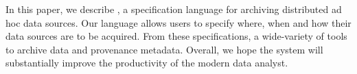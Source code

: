 

In this paper, we describe \padsd{}, a specification
language for archiving distributed ad hoc data sources.  Our language
allows users to specify where, when and how their data sources are
to be acquired.  From these specifications,
a wide-variety of tools to archive data and provenance metadata.  
Overall, we hope the system will substantially improve the productivity of
the modern data analyst.

